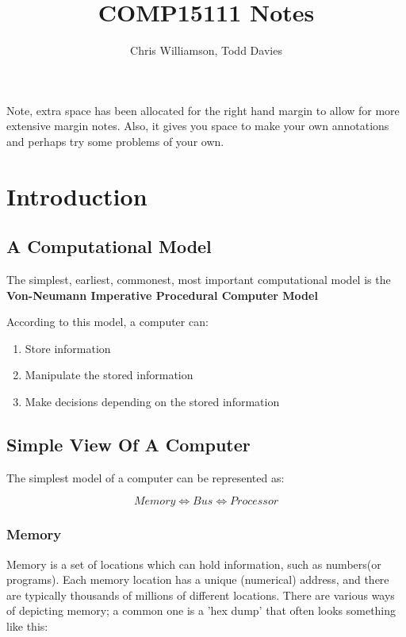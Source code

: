 \documentclass{article}
\begin{document}
\author{Chris Williamson, Todd Davies}
\title{COMP15111 Notes}

\maketitle

{\small Note, extra space has been allocated for the right hand margin to allow
for more extensive margin notes. Also, it gives you space to make your own
annotations and perhaps try some problems of your own.}

\tableofcontents
\newpage

\section{Introduction}
\subsection{A Computational Model}
The simplest, earliest, commonest, most important computational model is the \textbf{Von-Neumann Imperative Procedural Computer Model}

According to this model, a computer can:
\begin{enumerate}
	\item Store information
	\item Manipulate the stored information
	\item Make decisions depending on the stored information
\end{enumerate}

\subsection{Simple View Of A Computer}
The simplest model of a computer can be represented as:

\[
	Memory \Leftrightarrow Bus \Leftrightarrow Processor
\]

\subsubsection{Memory}
Memory is a set of locations which can hold information, such as numbers(or programs). Each memory location has a unique (numerical) address, and there are typically thousands of millions of different locations. There are various ways of depicting memory; a common one is a 'hex dump' that often looks something like this: 
\end{document}
